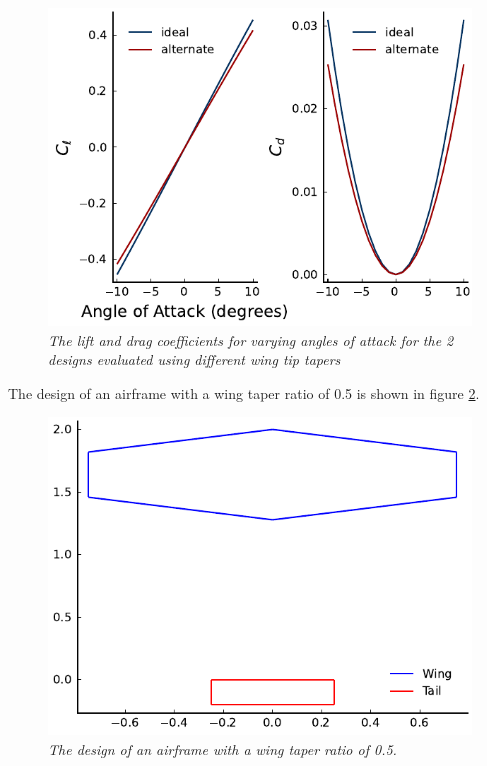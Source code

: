 \documentclass{journal}
\begin{document}
	\begin{figure}[H]
		\includegraphics{../graphics/taper_coeff.pdf}
		\caption{\emph{The lift and drag coefficients for varying angles of attack for the 2 designs evaluated using different wing tip tapers}}
		\label{fig:taper_coeff}
	\end{figure}
	
	The design of an airframe with a wing taper ratio of 0.5 is shown in figure \ref{fig:taper_design}.
	
	\begin{figure}[H]
		\includegraphics{../graphics/taper_design.pdf}
		\caption{\emph{The design of an airframe with a wing taper ratio of 0.5.}}
		\label{fig:taper_design}
	\end{figure}
\end{document}
